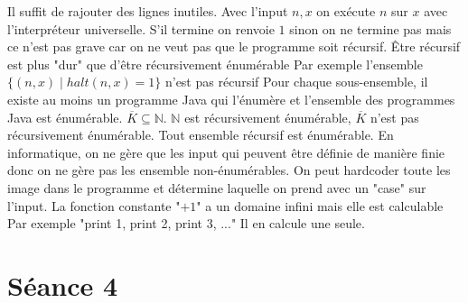 \begin{mcqs}
  {Il suffit de rajouter des lignes inutiles.}
  {Avec l'input $n,x$ on exécute $n$ sur $x$ avec l’interpréteur universelle.
  S'il termine on renvoie $1$ sinon on ne termine pas mais ce n'est pas grave car on ne veut pas que le programme soit récursif.}
  {Être récursif est plus "dur" que d'être récursivement énumérable}
  {Par exemple l'ensemble $\{(n,x) \mid \mathit{halt}(n,x)=1\}$ n'est pas récursif}
  {Pour chaque sous-ensemble, il existe au moins un programme Java qui l'énumère et l'ensemble des programmes Java est énumérable.}
  {$\overline{K} \subseteq \mathbb{N}$. $\mathbb{N}$ est récursivement énumérable, $\overline{K}$ n'est pas récursivement énumérable.}
  {Tout ensemble récursif est énumérable. En informatique, on ne gère que les input qui peuvent être définie de manière finie
  donc on ne gère pas les ensemble non-énumérables.}
  {On peut hardcoder toute les image dans le programme et détermine laquelle on prend avec un "case" sur l'input.\label{QCM:C3:1}}
  {La fonction constante "$+1$" a un domaine infini mais elle est calculable}
  {Par exemple "print 1, print 2, print 3, ..."}
  {Il en calcule une seule.}
\end{mcqs}

\section*{Séance 4}

